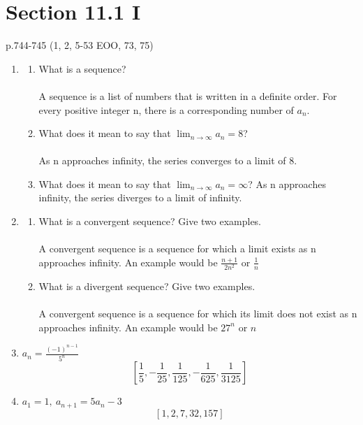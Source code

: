 \documentclass[12pt]{article}
\begin{document}
\newpage\section{Section 11.1 I}
p.744-745 (1, 2, 5-53 EOO, 73, 75)
\begin{enumerate}
    \item
        \begin{enumerate}
            \item What is a sequence?\\\\
                A sequence is a list of numbers that is written in a definite order. For every positive integer n, there is a corresponding number of $a_n$.\\
            \item What does it mean to say that $\lim_{n\to\infty}a_n = 8$?
                \\\\ As n approaches infinity, the series converges to a limit of 8.\\
            \item What does it mean to say that $\lim_{n\to\infty}a_n = \infty$?
                 As n approaches infinity, the series diverges to a limit of infinity.\\
        \end{enumerate}
    \item
        \begin{enumerate}
            \item What is a convergent sequence? Give two examples. 
                \\\\ A convergent sequence is a sequence for which a limit exists as n approaches infinity. An example would be $\frac{n+1}{2n^2}$ or $\frac{1}{n}$ \\
            \item What is a divergent sequence? Give two examples.
                \\\\ A convergent sequence is a sequence for which its limit does not exist as n approaches infinity. An example would be $27^n$ or $n$ \\
        \end{enumerate}
    \addtocounter{enumi}{2}\item $a_n=\frac{(-1)^{n-1}}{5^n}$
        \begin{equation*}
            \left[\frac{1}{5}, -\frac{1}{25}, \frac{1}{125}, -\frac{1}{625}, \frac{1}{3125}\right]
        \end{equation*}
    \addtocounter{enumi}{3}\item $a_1=1,\ a_{n+1}=5a_n-3$
        \begin{equation*}
            \left[1,2,7,32,157 \right]
        \end{equation*}
        

\end{enumerate}
\end{document}
